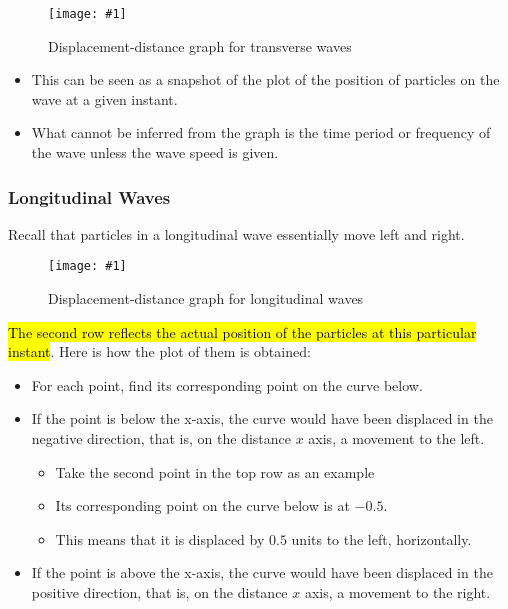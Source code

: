 \documentclass[a4paper,12pt]{article}
\newcommand{\img}[4]{\begin{center}
  \begin{figure}[H]
    \centering
    \texttt{[image: \#1]}
    \caption{#3}
    \label{fig:#4}
  \end{figure}
\end{center}}
\begin{document}
\img{dd_transverse.png}{0.9}{Displacement-distance graph for transverse waves}{dd_transverse}

\begin{itemize}
  \item This can be seen as a snapshot of the plot of the position of particles on the wave at a given instant.
  \item What cannot be inferred from the graph is the time period or frequency of the wave unless the wave speed is given.
\end{itemize}

\pagebreak

\subsubsection{Longitudinal Waves}

Recall that particles in a longitudinal wave essentially move left and right.

\img{dd_long.png}{0.9}{Displacement-distance graph for longitudinal waves}{dd_long}
\hl{The second row reflects the actual position of the particles at this particular instant}. Here is how the plot of them is obtained:
\begin{itemize}
  \item For each point, find its corresponding point on the curve below.
  \item If the point is below the x-axis, the curve would have been displaced in the negative direction, that is, on the distance $x$ axis, a movement to the left.
        \begin{itemize}
          \item  Take the second point in the top row as an example
          \item  Its corresponding point on the curve below is at $-0.5$.
          \item This means that it is displaced by $0.5$ units to the left, horizontally.
        \end{itemize}
  \item If the point is above the x-axis, the curve would have been displaced in the positive direction, that is, on the distance $x$ axis, a movement to the right.
\end{itemize}

\pagebreak
\end{document}
